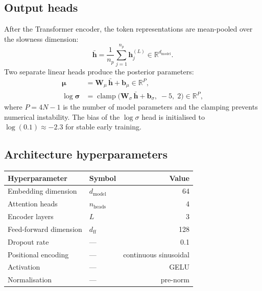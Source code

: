 \documentclass[11pt,a4paper]{article}
\theoremstyle{plain}
\theoremstyle{remark}
\begin{document}
\subsection{Output heads}

After the Transformer encoder, the token representations are
mean-pooled over the slowness dimension:
\begin{equation}\label{eq:mean-pool}
  \bar{\mathbf{h}} = \frac{1}{n_p}\sum_{j=1}^{n_p} \mathbf{h}_j^{(L)}
  \in \mathbb{R}^{d_{\text{model}}}.
\end{equation}
Two separate linear heads produce the posterior parameters:
\begin{align}
  \bm{\mu} &= \mathbf{W}_\mu\,\bar{\mathbf{h}} + \mathbf{b}_\mu
    \in \mathbb{R}^P, \label{eq:mu-head}\\
  \log\bm{\sigma} &= \operatorname{clamp}\!\bigl(
    \mathbf{W}_\sigma\,\bar{\mathbf{h}} + \mathbf{b}_\sigma,\;
    -5,\; 2\bigr)
    \in \mathbb{R}^P, \label{eq:sigma-head}
\end{align}
where $P = 4N - 1$ is the number of model parameters and the clamping
prevents numerical instability.  The bias of the $\log\sigma$ head is
initialised to $\log(0.1) \approx -2.3$ for stable early training.

\subsection{Architecture hyperparameters}

\begin{center}
\renewcommand{\arraystretch}{1.3}
\begin{tabular}{llr}
  \toprule
  \textbf{Hyperparameter} & \textbf{Symbol} & \textbf{Value} \\
  \midrule
  Embedding dimension     & $d_{\text{model}}$ & 64 \\
  Attention heads         & $n_{\text{heads}}$ & 4 \\
  Encoder layers          & $L$                & 3 \\
  Feed-forward dimension  & $d_{\text{ff}}$    & 128 \\
  Dropout rate            & ---                & 0.1 \\
  Positional encoding     & ---                & continuous sinusoidal \\
  Activation              & ---                & GELU \\
  Normalisation           & ---                & pre-norm \\
  \bottomrule
\end{tabular}
\end{center}
\end{document}
